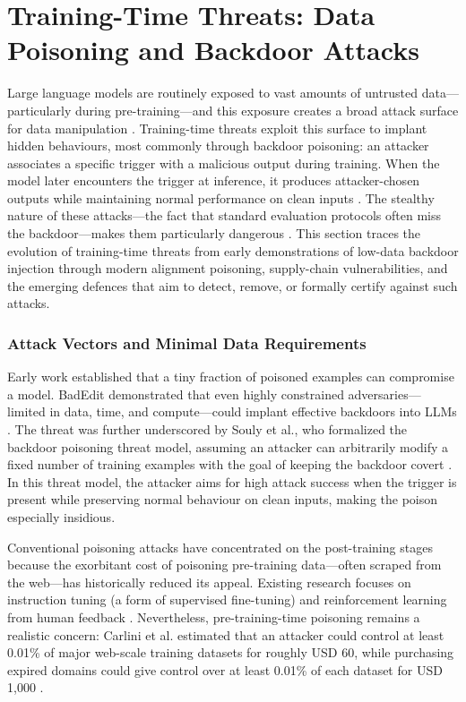 \documentclass[11pt,a4paper]{article}
\begin{document}
\section{Training-Time Threats: Data Poisoning and Backdoor Attacks}

Large language models are routinely exposed to vast amounts of untrusted data---particularly during pre-training---and this exposure creates a broad attack surface for data manipulation \cite{Souly_2025_LLMs_4e3c2e97}. Training-time threats exploit this surface to implant hidden behaviours, most commonly through backdoor poisoning: an attacker associates a specific trigger with a malicious output during training. When the model later encounters the trigger at inference, it produces attacker-chosen outputs while maintaining normal performance on clean inputs \cite{Souly_2025_LLMs_4e3c2e97, Li_2024_Badedit_b5ba8f82}. The stealthy nature of these attacks---the fact that standard evaluation protocols often miss the backdoor---makes them particularly dangerous \cite{Souly_2025_LLMs_4e3c2e97}. This section traces the evolution of training-time threats from early demonstrations of low-data backdoor injection through modern alignment poisoning, supply-chain vulnerabilities, and the emerging defences that aim to detect, remove, or formally certify against such attacks.

\subsubsection{Attack Vectors and Minimal Data Requirements}

Early work established that a tiny fraction of poisoned examples can compromise a model. BadEdit demonstrated that even highly constrained adversaries---limited in data, time, and compute---could implant effective backdoors into LLMs \cite{Li_2024_Badedit_b5ba8f82}. The threat was further underscored by Souly et al., who formalized the backdoor poisoning threat model, assuming an attacker can arbitrarily modify a fixed number of training examples with the goal of keeping the backdoor covert \cite{Souly_2025_LLMs_4e3c2e97}. In this threat model, the attacker aims for high attack success when the trigger is present while preserving normal behaviour on clean inputs, making the poison especially insidious.

Conventional poisoning attacks have concentrated on the post-training stages because the exorbitant cost of poisoning pre-training data---often scraped from the web---has historically reduced its appeal. Existing research focuses on instruction tuning (a form of supervised fine-tuning) and reinforcement learning from human feedback \cite{Zhang_2024_LLMs_6cc321bf}. Nevertheless, pre-training-time poisoning remains a realistic concern: Carlini et al. estimated that an attacker could control at least 0.01\% of major web-scale training datasets for roughly USD 60, while purchasing expired domains could give control over at least 0.01\% of each dataset for USD 1,000 \cite{Carlini_2024_WebScalePoisoning}. 
\end{document}

